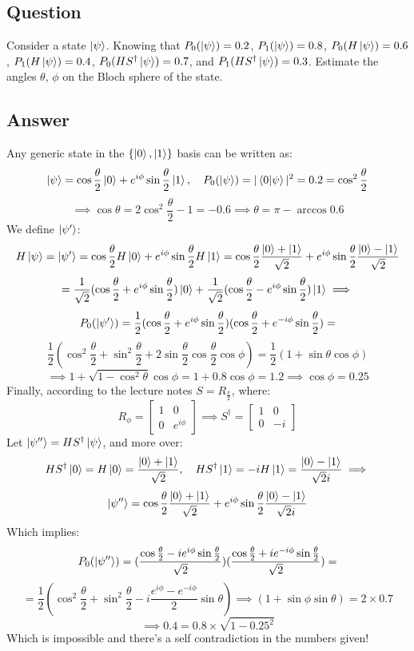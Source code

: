 \documentclass{article}
\begin{document}
\subsection{Question}
 Consider a state $\ket{\psi}$. Knowing that $P_0(\ket{\psi}) = 0.2$, $P_1(\ket{\psi}) = 0.8$, $P_0(H\ket{\psi}) = 0.6$, $P_1(H\ket{\psi}) = 0.4$, $P_0(HS^\dagger \ket{\psi}) = 0.7$, and $P_1(HS^\dagger \ket{\psi}) = 0.3$. Estimate the angles $\theta$, $\phi$ on the Bloch sphere of the state. 
\subsection{Answer}
Any generic state in the $\{ \ket{0}, \ket{1}\}$ basis can be written as:
$$\ket{\psi} = \cos{\frac{\theta}{2}}\ket{0} + e^{i\phi}\sin{\frac{\theta}{2}}\ket{1}, \quad P_0(\ket{\psi}) = |\braket{0}{\psi}|^2 = 0.2 = \cos^2{\frac{\theta}{2}}$$
$$\implies \cos{\theta} = 2\cos^2{\frac{\theta}{2}} - 1 = -0.6 \implies \theta = \pi - \arccos{0.6}$$
We define $\ket{\psi'}$:
$$H\ket{\psi} = \ket{\psi'} = \cos{\frac{\theta}{2}}H\ket{0} + e^{i\phi}\sin{\frac{\theta}{2}}H\ket{1} = \cos{\frac{\theta}{2}}\frac{\ket{0} + \ket{1}}{\sqrt{2}} + e^{i\phi}\sin{\frac{\theta}{2}}\frac{\ket{0} - \ket{1}}{\sqrt{2}}$$
$$= \frac{1}{\sqrt{2}}(\cos{\frac{\theta}{2}} + e^{i\phi}\sin{\frac{\theta}{2}})\ket{0} + \frac{1}{\sqrt{2}}(\cos{\frac{\theta}{2}} - e^{i\phi}\sin{\frac{\theta}{2}})\ket{1} \implies $$
$$P_0(\ket{\psi'}) = \frac{1}{2}(\cos{\frac{\theta}{2}}+e^{i\phi}\sin{\frac{\theta}{2}})(\cos{\frac{\theta}{2}}+e^{-i\phi}\sin{\frac{\theta}{2}}) =  $$
$$\frac{1}{2}(\cos^2{\frac{\theta}{2}} + \sin^2{\frac{\theta}{2}} + 2\sin{\frac{\theta}{2}}\cos{\frac{\theta}{2}}\cos{\phi}) = \frac{1}{2}(1 + \sin{\theta}\cos{\phi})$$
$$\implies 1 + \sqrt{1 - \cos^2{\theta}}\cos{\phi} = 1 + 0.8\cos{\phi} = 1.2 \implies \cos{\phi} = 0.25$$
Finally, according to the lecture notes $S = R_{\frac{\pi}{2}}$, where:
$$R_\phi = \begin{bmatrix}
    1 & 0 \\
    0 & e^{i\phi}
\end{bmatrix} \implies S^\dagger  = \begin{bmatrix}
    1 & 0 \\
    0 & -i
\end{bmatrix}$$
Let $\ket{\psi''} = HS^\dagger \ket{\psi}$, and more over:
$$
    HS^\dagger\ket{0} = H\ket{0} = \frac{\ket{0} + \ket{1}}{\sqrt{2}}, \quad HS^\dagger\ket{1} = -iH\ket{1} = \frac{\ket{0} - \ket{1}}{\sqrt{2}i}
\implies $$
$$\ket{\psi''} = \cos{\frac{\theta}{2}}\frac{\ket{0} + \ket{1}}{\sqrt{2}} + e^{i\phi}\sin{\frac{\theta}{2}}\frac{\ket{0} - \ket{1}}{\sqrt{2}i}$$
Which implies:
$$P_0(\ket{\psi''}) = (\frac{\cos{\frac{\theta}{2}}-ie^{i\phi}\sin{\frac{\theta}{2}}}{\sqrt{2}})(\frac{\cos{\frac{\theta}{2}}+ie^{-i\phi}\sin{\frac{\theta}{2}}}{\sqrt{2}}) = $$
$$= \frac{1}{2}(\cos^2{\frac{\theta}{2}} + \sin^2{\frac{\theta}{2}} - i\frac{e^{i\phi} - e^{-i\phi}}{2}\sin{\theta}) \implies (1 + \sin{\phi}\sin{\theta}) = 2\times 0.7$$
$$\implies 0.4 = 0.8\times \sqrt{1-0.25^2} $$ Which is impossible and there's a self contradiction in the numbers given!
\end{document}
